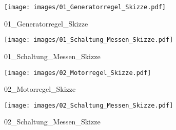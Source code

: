 %
%
%
\begin{figure}[!hb]%
    \centering
  \texttt{[image: images/01\_Generatorregel\_Skizze.pdf]}%
  \caption{01_Generatorregel_Skizze}%
\end{figure}

%
%
\begin{figure}[!hb]%
    \centering
  \texttt{[image: images/01\_Schaltung\_Messen\_Skizze.pdf]}%
  \caption{01_Schaltung_Messen_Skizze}%
\end{figure}

%
%
\begin{figure}[!hb]%
    \centering
  \texttt{[image: images/02\_Motorregel\_Skizze.pdf]}%
  \caption{02_Motorregel_Skizze}%
\end{figure}

%
%
\begin{figure}[!hb]%
    \centering
  \texttt{[image: images/02\_Schaltung\_Messen\_Skizze.pdf]}%
  \caption{02_Schaltung_Messen_Skizze}%
\end{figure}

